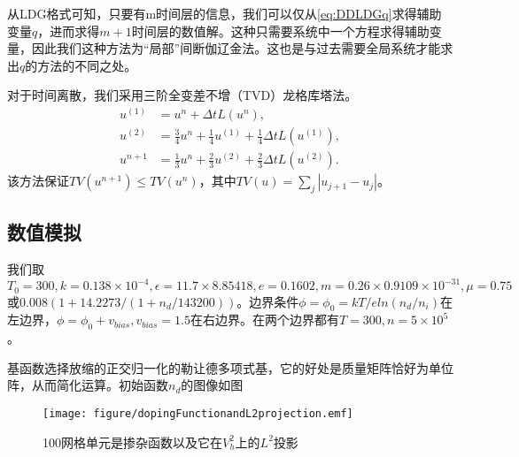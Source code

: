 从LDG格式可知，只要有m时间层的信息，我们可以仅从\eqref{eq:DDLDGq}求得辅助变量$q$，进而求得$m+1$时间层的数值解。这种只需要系统中一个方程求得辅助变量，因此我们这种方法为“局部”间断伽辽金法。这也是与过去需要全局系统才能求出$q$的方法的不同之处。

对于时间离散，我们采用三阶全变差不增（TVD）龙格库塔法。
\begin{align}
    u^{(1)} & = u^n + \Delta t L(u^n),                                                \\
    u^{(2)} & = \frac{3}{4}u^n + \frac{1}{4}u^{(1)} + \frac{1}{4}\Delta t L(u^{(1)}), \\
    u^{n+1} & = \frac{1}{3}u^n + \frac{2}{3}u^{(2)} + \frac{2}{3}\Delta t L(u^{(2)}).
\end{align}
该方法保证$TV(u^{n+1})\leq TV(u^n)$，其中$TV(u) = \sum_j |u_{j+1}-u_j|$。

\subsection{数值模拟}
我们取$T_0 = 300, k = 0.138 \times 10^{-4}, \epsilon = 11.7\times 8.85418, e = 0.1602, m = 0.26\times0.9109\times 10^{-31}, \mu = 0.75 $或$0.008(1+14.2273/(1+n_d/143200))$。边界条件$\phi=\phi_0=kT/e ln(n_d/n_i)$在左边界，$\phi = \phi_0+v_{bias}, v_{bias}=1.5$在右边界。在两个边界都有$T=300, n = 5\times 10^5$。

基函数选择放缩的正交归一化的勒让德多项式基，它的好处是质量矩阵恰好为单位阵，从而简化运算。初始函数$n_d$的图像如图
\begin{figure}
    \centering
    \texttt{[image: figure/dopingFunctionandL2projection.emf]}
    \caption{\small 100网格单元是掺杂函数以及它在$V_h^2$上的$L^2$投影}
\end{figure}